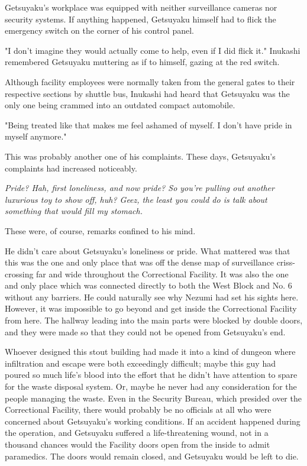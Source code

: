 Getsuyaku's workplace was equipped with neither surveillance cameras nor
security systems. If anything happened, Getsuyaku himself had to flick
the emergency switch on the corner of his control panel.

"I don't imagine they would actually come to help, even if I did flick
it." Inukashi remembered Getsuyaku muttering as if to himself, gazing at
the red switch.

Although facility employees were normally taken from the general gates
to their respective sections by shuttle bus, Inukashi had heard that
Getsuyaku was the only one being crammed into an outdated compact
automobile.

"Being treated like that makes me feel ashamed of myself. I don't have
pride in myself anymore."

This was probably another one of his complaints. These days, Getsuyaku's
complaints had increased noticeably.

\emph{Pride? Hah, first loneliness, and now pride? So you're pulling out
another luxurious toy to show off, huh? Geez, the least you could do is
talk about something that would fill my stomach.}

These were, of course, remarks confined to his mind.

He didn't care about Getsuyaku's loneliness or pride. What mattered was
that this was the one and only place that was off the dense map of
surveillance criss-crossing far and wide throughout the Correctional
Facility. It was also the one and only place which was connected
directly to both the West Block and No. 6 without any barriers. He could
naturally see why Nezumi had set his sights here. However, it was
impossible to go beyond and get inside the Correctional Facility from
here. The hallway leading into the main parts were blocked by double
doors, and they were made so that they could not be opened from
Getsuyaku's end.

Whoever designed this stout building had made it into a kind of dungeon
where infiltration and escape were both exceedingly difficult; maybe
this guy had poured so much life's blood into the effort that he didn't
have attention to spare for the waste disposal system. Or, maybe he
never had any consideration for the people managing the waste. Even in
the Security Bureau, which presided over the Correctional Facility,
there would probably be no officials at all who were concerned about
Getsuyaku's working conditions. If an accident happened during the
operation, and Getsuyaku suffered a life-threatening wound, not in a
thousand chances would the Facility doors open from the inside to admit
paramedics. The doors would remain closed, and Getsuyaku would be left
to die.

